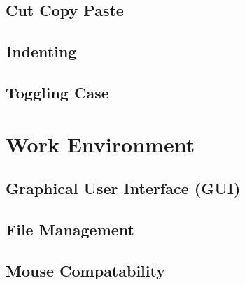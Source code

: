 \documentclass[12pt, oneside]{book}
\begin{document}
  \subsection{Cut Copy Paste}
  \subsection{Indenting}
  \subsection{Toggling Case}
\section{Work Environment}
  \subsection{Graphical User Interface (GUI)}
  \subsection{File Management}
  \subsection{Mouse Compatability}
\end{document}
